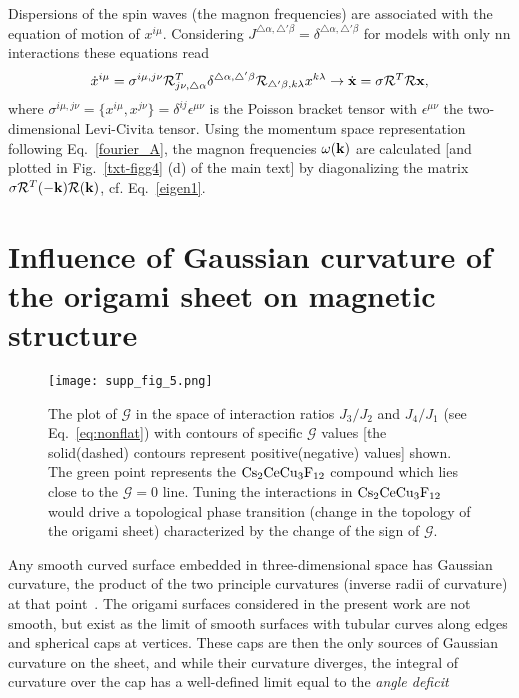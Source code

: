 \documentclass[a4paper,aps,prl,floatfix,showpacs,superscriptaddress,notitlepage]{revtex4-1}
\begin{document}
Dispersions of the spin waves (the magnon frequencies) are associated with the equation of motion of $x^{i\mu}$. Considering $J^{\triangle\alpha,\triangle'\beta}=\delta^{\triangle\alpha,\triangle'\beta}$ for models with only nn interactions these equations read
\begin{equation}
 \dot{x}^{i\mu} = \sigma^{i\mu,j\nu} {\mathcal R}^{T}_{j\nu,\triangle\alpha}
\delta^{\triangle\alpha,\triangle'\beta}{\mathcal R}_{\triangle'\beta,k\lambda} x^{k\lambda}\to \dot{\bf x} = {\bf \sigma}{\bf \mathcal R}^T{\bf \mathcal R}{\bf x},
 \label{eigen1}
\end{equation}
where $\sigma^{i\mu,j\nu}=\{x^{i\mu},x^{j\nu}\}=\delta^{ij}\epsilon^{\mu\nu}$ is the Poisson bracket tensor with $\epsilon^{\mu\nu}$ the two-dimensional Levi-Civita tensor. Using the momentum space representation following Eq.~\ref{fourier_A}, the magnon frequencies $\omega({\bf{k}})$ are calculated [and plotted in Fig.~\ref{txt-figg4} (d) of the main text] by diagonalizing the matrix ${\bf{\sigma}}{\mathcal R}^T(-{\bf{k}}) {\mathcal R}({\bf{k}})$, cf. Eq.~\ref{eigen1}.\\


\section{Influence of Gaussian curvature of the origami sheet on magnetic structure}\label{secthree}

\begin{figure}
\centering
 \texttt{[image: supp\_fig\_5.png]}
 \caption{The plot of $\mathcal{G}$ in the space of interaction ratios $J_3/J_2$ and $J_4/J_1$ (see Eq.~\ref{eq:nonflat}) with contours of specific $\mathcal{G}$ values [the solid(dashed) contours represent positive(negative) values] shown. The green point represents the ${\rm Cs}_2{\rm CeCu}_3{\rm F}_{12}$ compound which lies close to the $\mathcal{G}=0$ line. Tuning the interactions in ${\rm Cs}_2{\rm CeCu}_3{\rm F}_{12}$ would drive a topological phase transition (change in the topology of the origami sheet) characterized by the change of the sign of $\mathcal{G}$.}
\label{fig_latt3}
\end{figure}


Any smooth curved surface embedded in three-dimensional space has Gaussian curvature, the product of the two principle curvatures (inverse radii of curvature) at that point~\cite{kamien2002geometry}. The origami surfaces considered in the present work are not smooth, but exist as the limit of smooth surfaces with tubular curves along edges and spherical caps at vertices. These caps are then the only sources of Gaussian curvature on the sheet, and while their curvature diverges, the integral of curvature over the cap has a well-defined limit equal to the \emph{angle deficit} 
\end{document}
